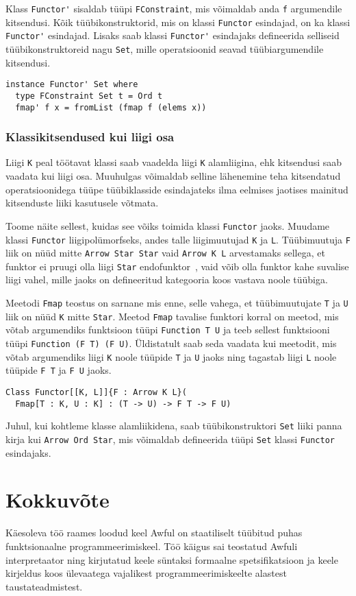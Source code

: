 \documentclass[12pt]{article}
\newcommand\peatykk[1]{
  \clearpage
  \section{#1}}
\begin{document}
        Klass \verb!Functor'! sisaldab tüüpi \verb!FConstraint!, mis võimaldab anda \verb!f! argumendile kitsendusi. Kõik tüübikonstruktorid, mis on klassi \verb!Functor! esindajad, on ka klassi \verb!Functor'! esindajad. Lisaks saab klassi \verb!Functor'! esindajaks defineerida selliseid tüübikonstruktoreid nagu \verb!Set!, mille operatsioonid seavad tüübiargumendile kitsendusi.

        \begin{verbatim}instance Functor' Set where
  type FConstraint Set t = Ord t
  fmap' f x = fromList (fmap f (elems x))\end{verbatim}
      \subsubsection{Klassikitsendused kui liigi osa}
        Liigi \verb!K! peal töötavat klassi saab vaadelda liigi \verb!K! alamliigina, ehk kitsendusi saab vaadata kui liigi osa. Muuhulgas võimaldab selline lähenemine teha kitsendatud operatsioonidega tüüpe tüübiklasside esindajateks ilma eelmises jaotises mainitud kitsenduste liiki kasutusele võtmata.

        Toome näite sellest, kuidas see võiks toimida klassi \verb!Functor! jaoks. Muudame klassi \verb!Functor! liigipolümorfseks, andes talle liigimuutujad \verb!K! ja \verb!L!. Tüübimuutuja \verb!F! liik on nüüd mitte \verb!Arrow Star Star! vaid \verb!Arrow K L! arvestamaks sellega, et funktor ei pruugi olla liigi \verb!Star! endofunktor~\cite{Cat}, vaid võib olla funktor kahe suvalise liigi vahel, mille jaoks on defineeritud kategooria koos vastava noole tüübiga.

        Meetodi \verb!Fmap! teostus on sarnane mis enne, selle vahega, et tüübimuutujate \verb!T! ja \verb!U! liik on nüüd \verb!K! mitte \verb!Star!. Meetod \verb!Fmap! tavalise funktori korral on meetod, mis võtab argumendiks funktsioon tüüpi \verb!Function T U! ja teeb sellest funktsiooni tüüpi \verb!Function (F T) (F U)!. Üldistatult saab seda vaadata kui meetodit, mis võtab argumendiks liigi \verb!K! noole tüüpide \verb!T! ja \verb!U! jaoks ning tagastab liigi \verb!L! noole tüüpide \verb!F T! ja \verb!F U! jaoks.

        \begin{verbatim}Class Functor[[K, L]]{F : Arrow K L}(
  Fmap[T : K, U : K] : (T -> U) -> F T -> F U)\end{verbatim}

        Juhul, kui kohtleme klasse alamliikidena, saab tüübikonstruktori \verb!Set! liiki panna kirja kui \verb!Arrow Ord Star!, mis võimaldab defineerida tüüpi \verb!Set! klassi \verb!Functor! esindajaks.
  \peatykk{Kokkuvõte}
    Käesoleva töö raames loodud keel Awful on staatiliselt tüübitud puhas funktsionaalne programmeerimiskeel. Töö käigus sai teostatud Awfuli interpretaator ning kirjutatud keele süntaksi formaalne spetsifikatsioon ja keele kirjeldus koos ülevaatega vajalikest programmeerimiskeelte alastest taustateadmistest.
\end{document}
